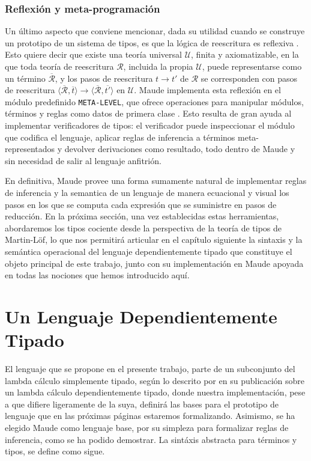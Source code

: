 \documentclass[a4paper,12pt]{report}
\theoremstyle{definition}
\theoremstyle{plain}
\theoremstyle{remark}
\begin{document}
\subsection{Reflexi\'on y meta-programaci\'on}
Un \'ultimo aspecto que conviene mencionar, dada su utilidad cuando se construye un prototipo de un sistema de tipos, es que la l\'ogica de reescritura es reflexiva \citep{clavel2007}. Esto quiere decir que existe una teor\'ia universal $\mathcal{U}$, finita y axiomatizable, en la que toda teor\'ia de reescritura $\mathcal{R}$, incluida la propia $\mathcal{U}$, puede representarse como un t\'ermino $\overline{\mathcal{R}}$, y los pasos de reescritura $t \to t'$ de $\mathcal{R}$ se corresponden con pasos de reescritura $\langle \overline{\mathcal{R}}, \overline{t}\rangle \to \langle \overline{\mathcal{R}}, \overline{t'}\rangle$ en $\mathcal{U}$. Maude implementa esta reflexi\'on en el m\'odulo predefinido \texttt{META-LEVEL}, que ofrece operaciones para manipular m\'odulos, t\'erminos y reglas como datos de primera clase \citep{duran2019}. Esto resulta de gran ayuda al implementar verificadores de tipos: el verificador puede inspeccionar el m\'odulo que codifica el lenguaje, aplicar reglas de inferencia a t\'erminos meta-representados y devolver derivaciones como resultado, todo dentro de Maude y sin necesidad de salir al lenguaje anfitri\'on.
\newline
\newline

\indent En definitiva, Maude provee una forma sumamente natural de implementar reglas de inferencia y la semantica de un lenguaje de manera ecuacional y visual los pasos en los que se computa cada expresión que se suministre en pasos de reducción.
\newline
\newline
En la próxima sección, una vez establecidas estas herramientas, abordaremos los tipos cociente desde la perspectiva de la teoría de tipos de Martin-L\"of, lo que nos permitir\'a articular en el capítulo siguiente la sintaxis y la semántica operacional del lenguaje dependientemente tipado que constituye el objeto principal de este trabajo, junto con su implementaci\'on en Maude apoyada en todas las nociones que hemos introducido aquí.
    \chapter{Un Lenguaje Dependientemente Tipado}
    El lenguaje que se propone en el presente trabajo, parte de un subconjunto del lambda cálculo simplemente tipado, según lo descrito por \citet{loh2010} en su publicación sobre un lambda cálculo dependientemente tipado, donde nuestra implementación, pese a que difiere ligeramente de la suya, definirá las bases para el prototipo de lenguaje que en las próximas páginas estaremos formalizando. Asimismo, se ha elegido Maude como lenguaje base, por su simpleza para formalizar reglas de inferencia, como se ha podido demostrar. La sintáxis abstracta para términos y tipos, se define como sigue.
\end{document}
